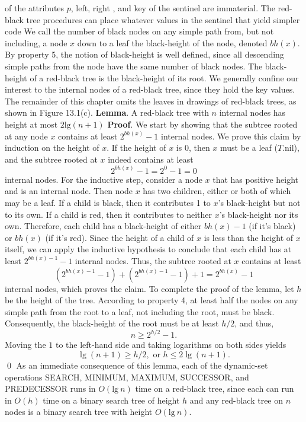 \documentclass{report}
\begin{document}
of the attributes $p$, left, right , and key of the sentinel are immaterial. The red-black
tree procedures can place whatever values in the sentinel that yield simpler code
\bigbreak \noindent 
We call the number of black nodes on any simple path from, but not including, a node $x$ down to a leaf the black-height of the node, denoted $bh(x)$.
\bigbreak \noindent 
By property 5, the notion of black-height is well defined, since all descending simple paths from the node have the same number of black nodes. The black-height of a red-black tree is the black-height of its root.
\bigbreak \noindent 
{}
\bigbreak \noindent 
We generally confine our interest to the internal nodes of a red-black tree, since they hold the key values. The remainder of this chapter omits the leaves in drawings of red-black trees, as shown in Figure 13.1(c).
\bigbreak \noindent 
\textbf{Lemma}. A red-black tree with $n$ internal nodes has height at most $2\text{lg}(n+1) $
\bigbreak \noindent 
\textbf{Proof}. 
We start by showing that the subtree rooted at any node \(x\) contains at least \(2^{bh(x)} - 1\) internal nodes. We prove this claim by induction on the height of \(x\). 
\bigbreak \noindent 
If the height of \(x\) is 0, then \(x\) must be a leaf (\(T.\text{nil}\)), and the subtree rooted at \(x\) indeed contains at least 
\[
2^{bh(x)} - 1 = 2^0 - 1 = 0
\] 
internal nodes.
\bigbreak \noindent 
For the inductive step, consider a node \(x\) that has positive height and is an internal node. Then node \(x\) has two children, either or both of which may be a leaf. If a child is black, then it contributes 1 to \(x\)'s black-height but not to its own. If a child is red, then it contributes to neither \(x\)'s black-height nor its own. 
\bigbreak \noindent 
Therefore, each child has a black-height of either \(bh(x) - 1\) (if it’s black) or \(bh(x)\) (if it’s red). Since the height of a child of \(x\) is less than the height of \(x\) itself, we can apply the inductive 
hypothesis to conclude that each child has at least \(2^{bh(x)-1} - 1\) internal nodes. Thus, the subtree rooted at \(x\) contains at least
\[
    (2^{bh(x)-1} - 1) + (2^{bh(x)-1} - 1) + 1 = 2^{bh(x)} - 1
\]
internal nodes, which proves the claim.
\bigbreak \noindent 
To complete the proof of the lemma, let \(h\) be the height of the tree. According to property 4, at least half the nodes on any simple path from the root to a leaf, not including the root, must be black. Consequently, the black-height of the root must be at least \(h/2\), and thus,
\[
    n \geq 2^{h/2} - 1.
\]
Moving the \(1\) to the left-hand side and taking logarithms on both sides yields
\[
    \lg(n + 1) \geq h/2, \text{ or } h \leq 2\lg(n + 1).
\]
\qed
\bigbreak \noindent 
As an immediate consequence of this lemma, each of the dynamic-set operations SEARCH, MINIMUM, MAXIMUM, SUCCESSOR, and PREDECESSOR runs in $O(\text{lg}\ n) $ time on a red-black tree, since each can run in $O(h)$ time on a binary search tree of height $h$ 
 and any red-black tree on $n$ nodes is a binary search tree with height $O(\text{lg}\ n)$.
 \bigbreak \noindent 
\end{document}
